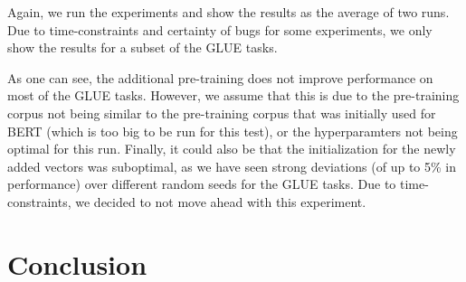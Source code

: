 \documentclass[a4paper,12pt,oneside,openright]{report}
\begin{document}
Again, we run the experiments and show the results as the average of two runs.
Due to time-constraints and certainty of bugs for some experiments, we only show the results for a subset of the GLUE tasks.

\hfill \break


\hfill \break

As one can see, the additional pre-training does not improve performance on most of the GLUE tasks.
However, we assume that this is due to the pre-training corpus not being similar to the pre-training corpus that was initially used for BERT (which is too big to be run for this test), or the hyperparamters not being optimal for this run.
Finally, it could also be that the initialization for the newly added vectors was suboptimal, as we have seen strong deviations (of up to 5\% in performance) over different random seeds for the GLUE tasks.
Due to time-constraints, we decided to not move ahead with this experiment.

\chapter{Conclusion}\label{section:Conclusion}
\end{document}
